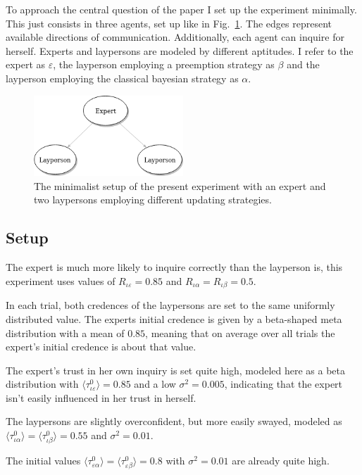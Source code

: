 \documentclass[11pt, a4paper]{scrartcl}
\renewcommand{\a}{\alpha}
\begin{document}
To approach the central question of the paper I set up the experiment minimally. This just consists in three agents, set up like in Fig.~\ref{fig:el}. The edges represent available directions of communication. Additionally, each agent can inquire for herself. Experts and laypersons are modeled by different aptitudes. I refer to the expert as $\varepsilon$, the layperson employing a preemption strategy as $\beta$ and the layperson employing the classical bayesian strategy as $\a$. 

\begin{figure}[ht]
	\centering
    \includegraphics[width=0.5\textwidth]{Expert_Layperson.png}
	\caption{The minimalist setup of the present experiment with an expert and two laypersons employing different updating strategies.\label{fig:el}}
\end{figure}

\subsection{Setup}
The expert is much more likely to inquire correctly than the layperson is, this experiment uses values of $R_{\iota\varepsilon} = 0.85$ and $R_{\iota\a} = R_{\iota\beta} = 0.5$.

In each trial, both credences of the laypersons are set to the same uniformly distributed value. The experts initial credence is given by a beta-shaped meta distribution with a mean of $ 0.85$, meaning that on average over all trials the expert's initial credence is about that value.

The expert's trust in her own inquiry is set quite high, modeled here as a beta distribution with $\langle \tau^0_{\iota\varepsilon} \rangle = 0.85$ and a low $\sigma^2 = 0.005$, indicating that the expert isn't easily influenced in her trust in herself.

The laypersons are slightly overconfident, but more easily swayed, modeled as $\langle \tau^0_{\iota\a} \rangle =\langle \tau^0_{\iota\beta} \rangle = 0.55$ and $\sigma^2 = 0.01$.

The initial values $\langle \tau^0_{\varepsilon\a} \rangle =\langle \tau^0_{\varepsilon\beta} \rangle = 0.8$ with $\sigma^2 = 0.01$ are already quite high.
\end{document}
